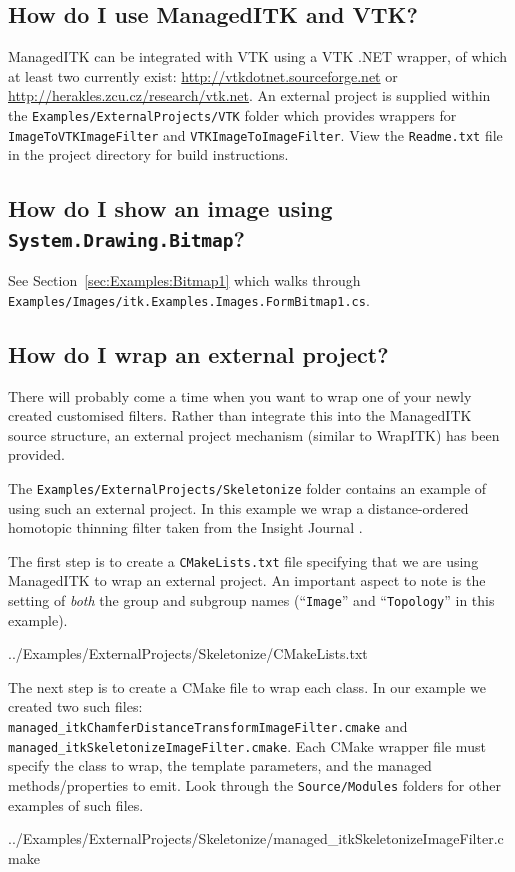 \documentclass{InsightArticle}
\def\code#1{\texttt{#1}}
\begin{document}
\subsection{How do I use ManagedITK and VTK?}
ManagedITK can be integrated with VTK using a VTK .NET wrapper,
of which at least two currently exist:
\href{http://vtkdotnet.sourceforge.net}{http://vtkdotnet.sourceforge.net}
or
\href{http://herakles.zcu.cz/research/vtk.net}{http://herakles.zcu.cz/research/vtk.net}.
An external project is supplied within the \code{Examples/ExternalProjects/VTK}
folder which provides wrappers for \code{ImageToVTKImageFilter} and
\code{VTKImageToImageFilter}.
View the \code{Readme.txt} file in the project directory for build instructions.

\subsection{How do I show an image using \code{System.Drawing.Bitmap}?}
See Section~\ref{sec:Examples:Bitmap1} which walks through
\code{Examples/Images/itk.Examples.Images.FormBitmap1.cs}.

\subsection{How do I wrap an external project?}
There will probably come a time when you want to wrap one of your
newly created customised filters.
Rather than integrate this into the ManagedITK source structure,
an external project mechanism (similar to WrapITK) has been provided.

The \code{Examples/ExternalProjects/Skeletonize} folder contains an example
of using such an external project.
In this example we wrap a distance-ordered homotopic thinning filter 
taken from the Insight Journal \cite{Lamy2006a}.

The first step is to create a \code{CMakeLists.txt} file specifying
that we are using ManagedITK to wrap an external project.
An important aspect to note is the setting of \emph{both} the
group and subgroup names (``\code{Image}'' and ``\code{Topology}''
in this example).
\begin{center}
	
	{../Examples/ExternalProjects/Skeletonize/CMakeLists.txt}
\end{center}

The next step is to create a CMake file to wrap each class.
In our example we created two such files:
\code{managed\_itkChamferDistanceTransformImageFilter.cmake} and
\code{managed\_itkSkeletonizeImageFilter.cmake}.
Each CMake wrapper file must specify the class to wrap,
the template parameters,
and the managed methods/properties to emit.
Look through the \code{Source/Modules} 
folders for other examples of such files.
\begin{center}
	
	{../Examples/ExternalProjects/Skeletonize/managed_itkSkeletonizeImageFilter.cmake}
\end{center}
\end{document}
